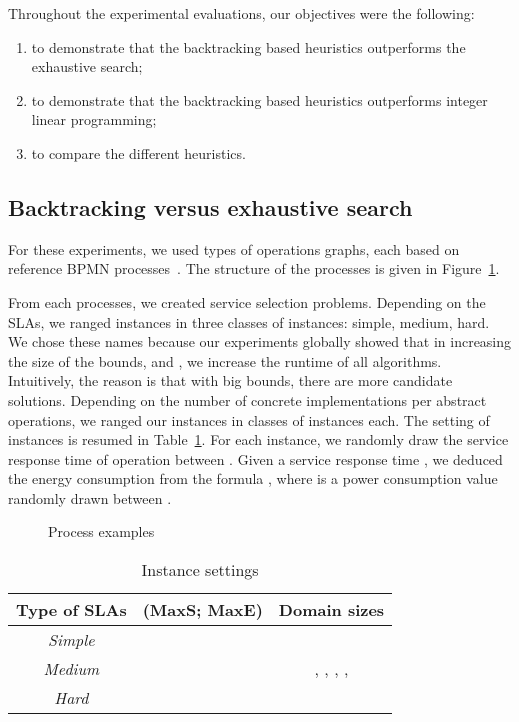 \documentclass[a4paper]{article}
\begin{document}
 Throughout the experimental evaluations, our objectives were the following:
\begin{enumerate}
\item to demonstrate that the backtracking based heuristics outperforms the exhaustive search;
\item to demonstrate that the backtracking based heuristics outperforms integer linear programming;
\item to compare the different heuristics.
\end{enumerate}

\subsection{Backtracking versus exhaustive search}

For these experiments, we used  types of operations graphs, each based on 
reference BPMN processes~\cite{Omg,Freund}. The structure of the processes is given 
in Figure~\ref{figProcess}.

From each processes, we created  service selection problems. 
Depending on the SLAs, we ranged instances in three classes of  instances: simple, medium, hard. 
We chose these names because our experiments globally showed  that in increasing the size of the bounds, 
 and , we increase the runtime of all algorithms. Intuitively, the reason is that with 
big bounds, there are more candidate solutions.  
Depending on the number of concrete implementations per abstract operations, 
we ranged our instances in  classes of  instances each. The setting of instances 
is resumed in Table~\ref{instanceSetting}. 
For each instance, we randomly draw the service response time of operation between 
. Given a service response time , we deduced the energy consumption from 
the formula , where  is a power consumption value randomly drawn  between .



\begin{figure}[ht]
\centering
{}
\caption{Process examples}
\label{figProcess}
\end{figure}


\begin{table}[htbp]
\centering 
\begin{tabular}{c|c|c}
\hline
{\bf Type of SLAs }  & {\bf (MaxS; MaxE)} & {\bf Domain sizes}  \\\hline
  \textit{Simple}   & {}   & \multirow{3}{*}{, , , , } \\
  \textit{Medium}   & {}   \\
  \textit{Hard}   & {}   \\\hline
\end{tabular}
\caption{Instance settings}
\label{instanceSetting}
\end{table}
\end{document}
